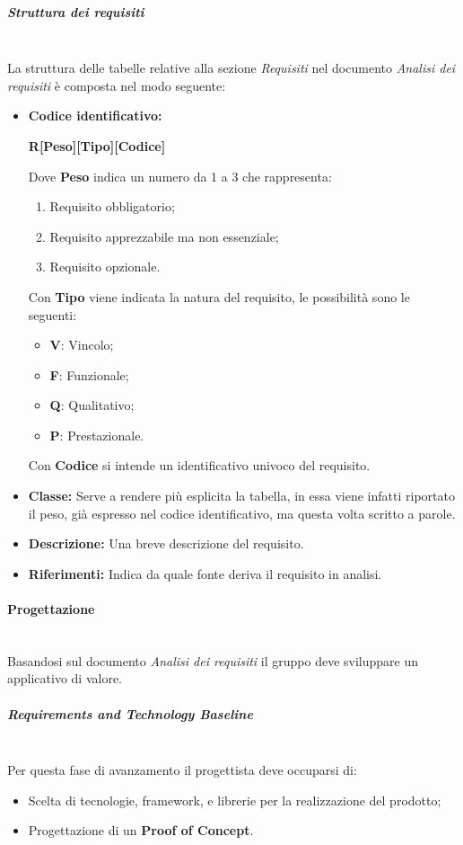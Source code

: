 \subparagraph{Struttura dei requisiti}
\mbox{} \\
La struttura delle tabelle relative alla sezione \textit{Requisiti} nel documento \textit{Analisi dei requisiti} è composta nel modo seguente:
\begin{itemize}
    \item   \textbf{Codice identificativo:}
            \par \centerline{\textbf{R[Peso][Tipo][Codice]}}
            Dove \textbf{Peso} indica un numero da 1 a 3 che rappresenta:
            \begin{enumerate}
                \item Requisito obbligatorio;
                \item Requisito apprezzabile ma non essenziale;
                \item Requisito opzionale.
            \end{enumerate}
            Con \textbf{Tipo} viene indicata la natura del requisito, le possibilità sono le seguenti:
            \begin{itemize}
                \item \textbf{V}: Vincolo;
                \item \textbf{F}: Funzionale;
                \item \textbf{Q}: Qualitativo;
                \item \textbf{P}: Prestazionale.
            \end{itemize}
            Con \textbf{Codice} si intende un identificativo univoco del requisito.
    \item \textbf{Classe:} Serve a rendere più esplicita la tabella, in essa viene infatti riportato il peso, già espresso nel codice identificativo, ma questa volta scritto a parole.
    \item \textbf{Descrizione:} Una breve descrizione del requisito.
    \item \textbf{Riferimenti:} Indica da quale fonte deriva il requisito in analisi.   
\end{itemize}

\paragraph{Progettazione}
\mbox{} \\
Basandosi sul documento \textit{Analisi dei requisiti} il gruppo deve sviluppare
un applicativo di valore.

\subparagraph{Requirements and Technology Baseline}
\mbox{} \\
Per questa fase di avanzamento il progettista deve occuparsi di:
\begin{itemize}
    \item Scelta di tecnologie, framework, e librerie per la realizzazione del prodotto;
    \item Progettazione di un \textbf{Proof of Concept}.
\end{itemize}

